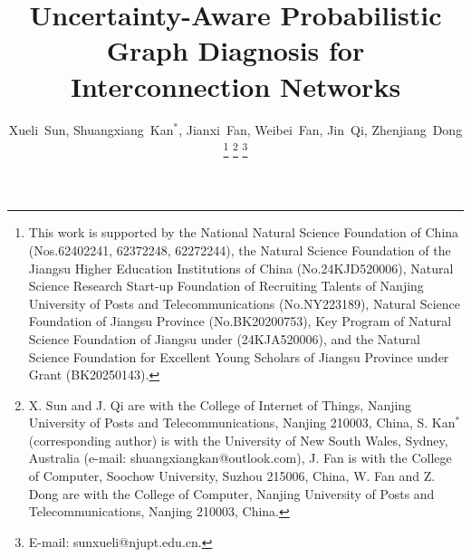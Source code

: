 \documentclass[lettersize,journal]{IEEEtran}
\theoremstyle{boldstyle}   %
\begin{document}
\title{Uncertainty-Aware Probabilistic Graph Diagnosis for Interconnection Networks}
\author{
Xueli~Sun, Shuangxiang~Kan$^{*}$, Jianxi~Fan, Weibei~Fan, Jin~Qi, Zhenjiang~Dong
\noindent\thanks{This work is supported by the National Natural Science Foundation of China (Nos.62402241, 62372248, 62272244), the Natural Science Foundation of the Jiangsu Higher Education Institutions of China (No.24KJD520006), Natural Science Research Start-up Foundation of Recruiting Talents of Nanjing University of Posts and Telecommunications (No.NY223189), Natural Science Foundation of Jiangsu Province (No.BK20200753), Key Program of Natural Science Foundation of Jiangsu under (24KJA520006), and the Natural Science Foundation for Excellent Young Scholars of Jiangsu Province under Grant (BK20250143).
}
\thanks{X. Sun and J. Qi are with the College of Internet of Things, Nanjing University of Posts and Telecommunications, Nanjing 210003, China, S. Kan$^{*}$ (corresponding author) is with the University of New South Wales, Sydney, Australia (e-mail: shuangxiangkan@outlook.com), J. Fan is with the College of Computer, Soochow University, Suzhou 215006, China, W. Fan and Z. Dong are with the College of Computer, Nanjing University of Posts and Telecommunications, Nanjing 210003, China. }
\thanks{E-mail: sunxueli@njupt.edu.cn.}
}




\maketitle
\end{document}
